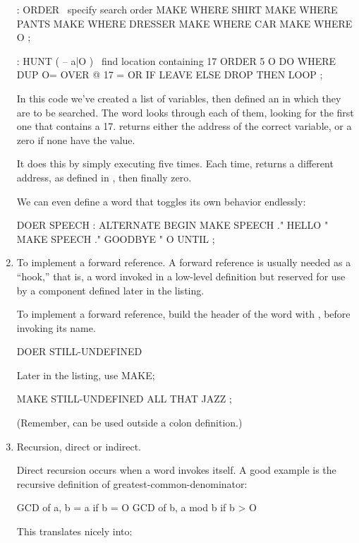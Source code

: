 \begin{enumerate}
\begin{Code}
: ORDER  \  specify search order
   MAKE WHERE  SHIRT   MAKE WHERE  PANTS
   MAKE WHERE  DRESSER   MAKE WHERE CAR
   MAKE WHERE  O ;

: HUNT  ( -- a|O )  \  find location containing 17
   ORDER  5 O DO  WHERE  DUP O=  OVER @  17 =  OR  IF
      LEAVE  ELSE  DROP  THEN  LOOP ;
\end{Code}
In this code we've created a list of variables, then defined an  in
which they are to be searched. The word  looks through each of them,
looking for the first one that contains a 17.  returns either the
address of the correct variable, or a zero if none have the value.

It does this by simply executing  five times. Each time, 
returns a different address, as defined in , then finally zero.

We can even define a  word that toggles its own behavior endlessly:

\begin{Code}
DOER SPEECH
: ALTERNATE
   BEGIN  MAKE SPEECH ." HELLO "
   MAKE SPEECH ." GOODBYE "
   O UNTIL ;
\end{Code}
\item To implement a forward reference. A forward reference is usually needed as
a ``hook,'' that is, a word invoked in a low-level definition but reserved for
use by a component defined later in the listing.

To implement a forward reference, build the header of the word with ,
before invoking its name.

\begin{Code}
DOER STILL-UNDEFINED
\end{Code}
Later in the listing, use MAKE;

\begin{Code}
MAKE STILL-UNDEFINED  ALL THAT JAZZ ;
\end{Code}
(Remember,  can be used outside a colon definition.)

\item Recursion, direct or indirect.

Direct recursion occurs when a word invokes itself. A good example is the
recursive definition of greatest-common-denominator:

\begin{Code}
GCD of a, b =  a                     if b = O
               GCD of b, a mod b     if b > O
\end{Code}
This translates nicely into:


\end{enumerate}

